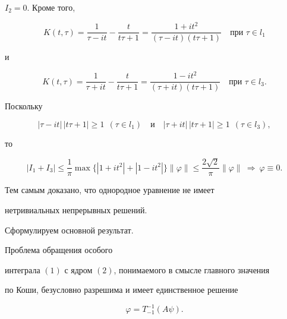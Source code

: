 \begin{pf}
$I_{2}=0$. Кроме того, 


$$


K(t,\tau)=\frac{1}{\tau-it}-


\frac{t}{t\tau+1}=\frac{1+it^{2}}{(\tau-it)(t\tau+1)}


\quad \text{при $\tau\in l_{1}$}


$$


и 


$$


K(t,\tau)=\frac{1}{\tau+it}-\frac{t}{t\tau+1}=


\frac{1-it^{2}}{(\tau+it)(t\tau+1)}\quad\text{при $\tau\in l_{3}$}.


$$


Поскольку


$$


|\tau-it|\,|t\tau+1|\geq 1\ \ (\tau\in l_{1})\quad


\text{и}


\quad |\tau+it|\,|t\tau+1|\geq 1\ \ (\tau\in l_{3}),


$$


то


$$


|I_{1}+I_{3}|\le \frac{1}{\pi}\max \{ |1+it^{2}|+|1-it^{2}|\}


\|\varphi\|\le\frac{2\sqrt{2}}{\pi}\|\varphi\|


\ \Longrightarrow \ \varphi\equiv 0.


$$


Тем самым доказано, что однородное уравнение не имеет


нетривиальных непрерывных решений.


\end{pf}





Сформулируем основной результат.








\begin{thmnonum}


Проблема обращения особого


интеграла $(1)$ с ядром $(2)$, понимаемого в смысле главного значения


по Коши, безусловно разрешима и имеет единственное решение


$$


\varphi=T^{-1}_{-1}(A\psi).


$$


\end{thmnonum}






